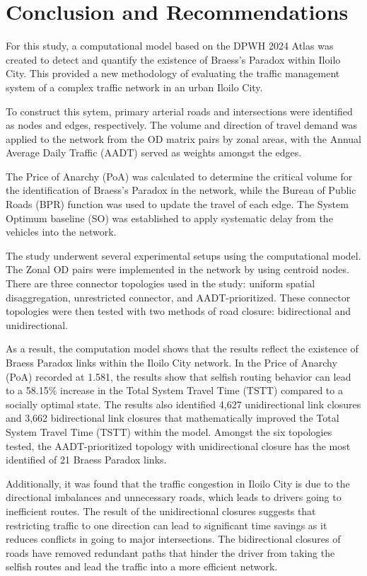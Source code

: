\chapter{Conclusion and Recommendations}
\label{chap:conclusion}

For this study, a computational model based on the DPWH 2024 Atlas was created to detect and quantify the existence of Braess's Paradox within Iloilo City. This provided a new methodology of evaluating the traffic management system of a complex traffic network in an urban Iloilo City.

To construct this sytem, primary arterial roads and intersections were identified as nodes and edges, respectively. The volume and direction of travel demand was applied to the network from the OD matrix pairs by zonal areas, with the Annual Average Daily Traffic (AADT) served as weights amongst the edges.

The Price of Anarchy (PoA) was calculated to determine the critical volume for the identification of Braess's Paradox in the network, while the Bureau of Public Roads (BPR) function was used to update the travel of each edge. The System Optimum baseline (SO) was established to apply systematic delay from the vehicles into the network. 

The study underwent several experimental setups using the computational model. The Zonal OD pairs were implemented in the network by using centroid nodes. There are three connector topologies used in the study: uniform spatial disaggregation, unrestricted connector, and AADT-prioritized. These connector topologies were then tested with two methods of road closure: bidirectional and unidirectional.

As a result, the computation model shows that the results reflect the existence of Braess Paradox links within the Iloilo City network. In the Price of Anarchy (PoA) recorded at 1.581, the results show that selfish routing behavior can lead to a 58.15\% increase in the Total System Travel Time (TSTT) compared to a socially optimal state. The results also identified 4,627 unidirectional link closures and 3,662 bidirectional link closures that mathematically improved the Total System Travel Time (TSTT) within the model. Amongst the six topologies tested, the AADT-prioritized topology with unidirectional closure has the most identified of 21 Braess Paradox links.

Additionally, it was found that the traffic congestion in Iloilo City is due to the directional imbalances and unnecessary roads, which leads to drivers going to inefficient routes. The result of the unidirectional closures suggests that restricting traffic to one direction can lead to significant time savings as it reduces conflicts in going to major intersections. The bidirectional closures of roads have removed redundant paths that hinder the driver from taking the selfish routes and lead the traffic into a more efficient network. 

